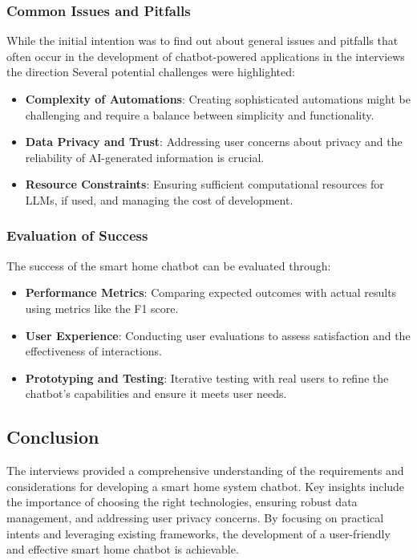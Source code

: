 \subsubsection{Common Issues and Pitfalls}

While the initial intention was to find out about general issues and pitfalls that often occur in the development of chatbot-powered applications in the interviews the direction 
Several potential challenges were highlighted:

\begin{itemize}
    \item \textbf{Complexity of Automations}: Creating sophisticated automations might be challenging and require a balance between simplicity and functionality.
    \item \textbf{Data Privacy and Trust}: Addressing user concerns about privacy and the reliability of AI-generated information is crucial.
    \item \textbf{Resource Constraints}: Ensuring sufficient computational resources for LLMs, if used, and managing the cost of development.
\end{itemize}

\subsubsection{Evaluation of Success}

The success of the smart home chatbot can be evaluated through:

\begin{itemize}
    \item \textbf{Performance Metrics}: Comparing expected outcomes with actual results using metrics like the F1 score.
    \item \textbf{User Experience}: Conducting user evaluations to assess satisfaction and the effectiveness of interactions.
    \item \textbf{Prototyping and Testing}: Iterative testing with real users to refine the chatbot's capabilities and ensure it meets user needs.
\end{itemize}

\subsection{Conclusion}

The interviews provided a comprehensive understanding of the requirements and considerations for developing a smart home system chatbot. Key insights include the importance of choosing the right technologies, ensuring robust data management, and addressing user privacy concerns. By focusing on practical intents and leveraging existing frameworks, the development of a user-friendly and effective smart home chatbot is achievable.


